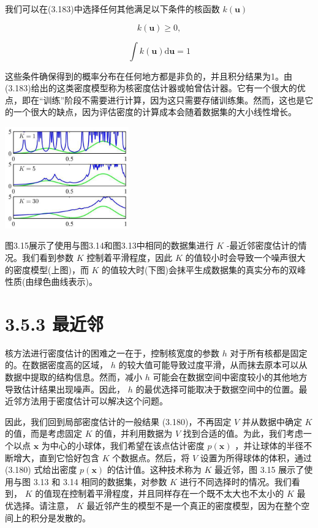 \documentclass[10pt]{article}
\begin{document}
我们可以在(3.183)中选择任何其他满足以下条件的核函数 \(k\left( \mathbf{u}\right)\)

\[
k\left( \mathbf{u}\right)  \geq  0, \tag{3.185}
\]

\[
\int k\left( \mathbf{u}\right) \mathrm{d}\mathbf{u} = 1 \tag{3.186}
\]

这些条件确保得到的概率分布在任何地方都是非负的，并且积分结果为1。由(3.183)给出的这类密度模型称为核密度估计器或帕曾估计器。它有一个很大的优点，即在“训练”阶段不需要进行计算，因为这只需要存储训练集。然而，这也是它的一个很大的缺点，因为评估密度的计算成本会随着数据集的大小线性增长。

\begin{center}
\includegraphics[max width=0.4\textwidth]{images/0194e279-9b28-703a-88f4-c3ac21e2010d_122_940_369_552_454_0.jpg}
\end{center}
\hspace*{3em} 

图3.15展示了使用与图3.14和图3.13中相同的数据集进行 \(K\) -最近邻密度估计的情况。我们看到参数 \(K\) 控制着平滑程度，因此 \(K\) 的值较小时会导致一个噪声很大的密度模型(上图)，而 \(K\) 的值较大时(下图)会抹平生成数据集的真实分布的双峰性质(由绿色曲线表示)。

\section*{3.5.3 最近邻}

核方法进行密度估计的困难之一在于，控制核宽度的参数 \(h\) 对于所有核都是固定的。在数据密度高的区域， \(h\) 的较大值可能导致过度平滑，从而抹去原本可以从数据中提取的结构信息。然而，减小 \(h\) 可能会在数据空间中密度较小的其他地方导致估计结果出现噪声。因此， \(h\) 的最优选择可能取决于数据空间中的位置。最近邻方法用于密度估计可以解决这个问题。

因此，我们回到局部密度估计的一般结果 (3.180)，不再固定 \(V\) 并从数据中确定 \(K\) 的值，而是考虑固定 \(K\) 的值，并利用数据为 \(V\) 找到合适的值。为此，我们考虑一个以点 \(\mathbf{x}\) 为中心的小球体，我们希望在该点估计密度 \(p\left( \mathbf{x}\right)\) ，并让球体的半径不断增大，直到它恰好包含 \(K\) 个数据点。然后，将 \(V\) 设置为所得球体的体积，通过 (3.180) 式给出密度 \(p\left( \mathbf{x}\right)\) 的估计值。这种技术称为 \(K\) 最近邻，图 3.15 展示了使用与图 3.13 和 3.14 相同的数据集，对参数 \(K\) 进行不同选择时的情况。我们看到， \(K\) 的值现在控制着平滑程度，并且同样存在一个既不太大也不太小的 \(K\) 最优选择。请注意， \(K\) 最近邻产生的模型不是一个真正的密度模型，因为在整个空间上的积分是发散的。
\end{document}
